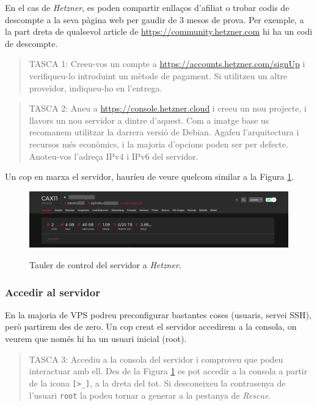 \documentclass{practicaitic}
\begin{document}
En el cas de \textit{Hetzner}, es poden compartir enllaços d'afiliat o trobar
codis de descompte a la seva pàgina web per gaudir de 3 mesos de prova. Per
exemple, a la part dreta de qualsevol article de \url{https://community.hetzner.com} hi ha un
codi de descompte.

\begin{quote}
TASCA 1: Creeu-vos un compte a \url{https://accounts.hetzner.com/signUp} i
verifiqueu-lo introduint un mètode de pagament. Si utilitzeu un altre proveïdor,
indiqueu-ho en l'entrega.
\end{quote}

\begin{quote}
TASCA 2: Aneu a \url{https://console.hetzner.cloud} i creeu un nou projecte, i
llavors un nou servidor a dintre d'aquest. Com a imatge base us
recomanem utilitzar la darrera versió de Debian. Agafeu l'arquitectura i
recursos més econòmics, i la majoria d'opcions poden ser per defecte.
Anoteu-vos l'adreça IPv4 i IPv6 del servidor.
\end{quote}

Un cop en marxa el servidor, hauríeu de veure quelcom similar a la Figura \ref{fig:h1}.

\begin{figure}[h]
  \includegraphics[width=0.9\linewidth]{assets/hetzner1.png}
  \centering
  \label{fig:h1}
  \caption{Tauler de control del servidor a \textit{Hetzner}.}
\end{figure}

\subsubsection{Accedir al servidor}

En la majoria de VPS podreu preconfigurar bastantes coses (usuaris, servei SSH),
però partirem des de zero. Un cop creat el servidor accedirem a la consola,
on veurem que només hi ha un usuari inicial (root).

\begin{quote}
TASCA 3: Accediu a la consola del servidor i comproveu que podeu interactuar amb
ell. Des de la Figura \ref{fig:h1} es pot accedir a la consola a partir de la
icona \verb|[>_]|, a la dreta del tot. Si desconeixeu la contrasenya de
l'usuari \verb|root| la podeu tornar a generar a la pestanya de \textit{Rescue}.
\end{quote}
\end{document}
